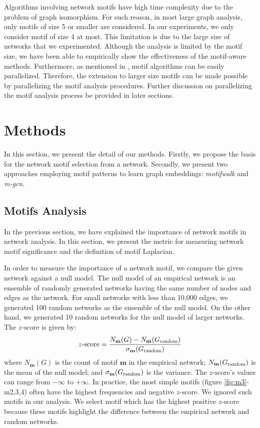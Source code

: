 \documentclass{article}
\theoremstyle{definition}
\begin{document}
Algorithms involving network motifs have high time complexity due to
the problem of graph isomorphism. For such reason, in most large graph
analysis, only motifs of size 5 or smaller are considered. In our 
experiments, we only consider motif of size 4 at most. This limitation is 
due to the large size of networks that we experimented. Although the
analysis is limited by the motif size, we have been able to empirically 
show the effectiveness of the motif-aware methods. Furthermore, as 
mentioned in \cite{juremotif}, motif algorithms can be easily 
parallelized. Therefore, the extension to larger size motifs can be made 
possible by parallelizing the motif analysis procedures. Further 
discussion on parallelizing the motif analysis process be provided in 
later sections.

\section{Methods}

In this section, we present the detail of our methods. Firstly,
we propose the basis for the network motif selection from a network.
Secondly, we present two approaches employing motif patterns to
learn graph embeddings: \emph{motifwalk} and \emph{m-gcn}.

\subsection{Motifs Analysis}

In the previous section, we have explained the importance of
network motifs in network analysis. In this section, we present
the metric for measuring network motif significance and the definition
of motif Laplacian.

In order to measure the importance of a network motif, we compare
the given network against a null model. The null model of an empirical 
network is an ensemble of randomly generated networks having the same 
number of nodes and edges as the network. For small networks with less 
than 10,000 edges, we generated 100 random networks as the ensemble of the 
null model. On the other hand, we generated 10 random networks for the 
null model of larger networks. The $z\mbox{-score}$ is given by:
\begin{equation*}
z\mbox{-score} = \frac{N_\mathbf{m}(G)-N_\mathbf{m}(G_{\scalebox{0.75}{random}})}{\sigma_\mathbf{m}(G_{\scalebox{0.75}{random}})}
\end{equation*}
where $N_\mathbf{m}(G)$ is the count of motif $\mathbf{m}$ in the 
empirical network; $N_\mathbf{m}(G_{\scalebox{0.75}{random}})$ is the mean 
of the null model; and $\sigma_\mathbf{m}(G_{\scalebox{0.75}{random}})$ is
the variance. The $z\mbox{-score}$'s values can range from 
$-\infty$ to $+\infty$. In practice, the most simple motifs (figure 
\ref{fig:m3}-m2,3,4) often have the highest frequencies and negative $z
\mbox{-score}$. We ignored such motifs in our analysis. We select motif 
which has the highest positive $z\mbox{-score}$ because these motifs
highlight the difference between the empirical network and random 
networks. 
\end{document}
